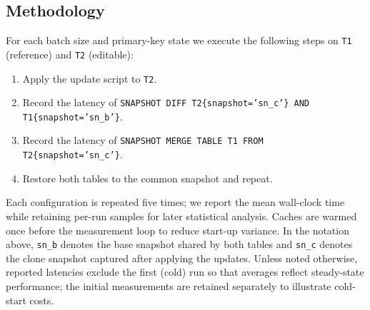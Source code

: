 \documentclass[sigconf,nonacm]{acmart} %
\begin{document}
\subsection{Methodology}
For each batch size and primary-key state we execute the following
steps on \texttt{T1} (reference) and \texttt{T2} (editable):
\begin{enumerate}
\item Apply the update script to \texttt{T2}.
\item Record the latency of \texttt{SNAPSHOT DIFF
      T2\{snapshot='sn\_c'\} AND T1\{snapshot='sn\_b'\}}.
\item Record the latency of \texttt{SNAPSHOT MERGE TABLE T1 FROM
      T2\{snapshot='sn\_c'\}}.
\item Restore both tables to the common snapshot and repeat.
\end{enumerate}
Each configuration is repeated five times; we report the mean wall-clock
time while retaining per-run samples for later statistical analysis.
Caches are warmed once before the measurement loop to reduce start-up
variance.  In the notation above, \texttt{sn\_b} denotes the base
snapshot shared by both tables and \texttt{sn\_c} denotes the clone
snapshot captured after applying the updates.  Unless noted otherwise,
reported latencies exclude the first (cold) run so that averages reflect
steady-state performance; the initial measurements are retained
separately to illustrate cold-start costs.
\end{document}
